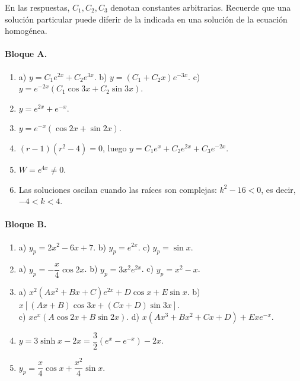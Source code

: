{\small\sloppy
\noindent En las respuestas, $C_1,C_2,C_3$ denotan constantes arbitrarias. Recuerde que una soluci\'on particular puede diferir de la indicada en una soluci\'on de la ecuaci\'on homog\'enea.

\paragraph{Bloque A.}
\begin{enumerate}[label=\textbf{A\arabic*.}, leftmargin=*]
    \item a) $y=C_1e^{2x}+C_2e^{3x}$. \quad b) $y=(C_1+C_2x)e^{-3x}$. \quad c) $y=e^{-2x}\left(C_1\cos3x+C_2\sin3x\right)$.
    \item $y=e^{2x}+e^{-x}$.
    \item $y=e^{-x}\left(\cos2x+\sin2x\right)$.
    \item $(r-1)(r^2-4)=0$, luego $y=C_1e^x+C_2e^{2x}+C_3e^{-2x}$.
    \item $W=e^{4x}\neq0$.
    \item Las soluciones oscilan cuando las ra\'ices son complejas: $k^2-16<0$, es decir, $-4<k<4$.
\end{enumerate}

\paragraph{Bloque B.}
\begin{enumerate}[label=\textbf{B\arabic*.}, leftmargin=*]
    \item a) $y_p=2x^2-6x+7$. \quad b) $y_p=e^{2x}$. \quad c) $y_p=\sin x$.
    \item a) $y_p=-\dfrac{x}{4}\cos 2x$. \quad b) $y_p=3x^2e^{2x}$. \quad c) $y_p=x^2-x$.
    \item a) $x^2\left(Ax^2+Bx+C\right)e^{2x}+D\cos x+E\sin x$. \quad b) $x\left[(Ax+B)\cos3x+(Cx+D)\sin3x\right]$.\\
    c) $xe^x\left(A\cos2x+B\sin2x\right)$. \quad d) $x\left(Ax^3+Bx^2+Cx+D\right)+Exe^{-x}$.
    \item $y=3\sinh x-2x=\dfrac32\left(e^x-e^{-x}\right)-2x$.
    \item $y_p=\dfrac{x}{4}\cos x+\dfrac{x^2}{4}\sin x$.
\end{enumerate}

}
